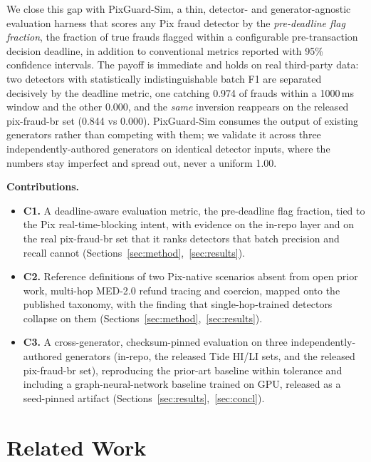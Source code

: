 \documentclass[12pt]{article}
\newcommand{\sysname}{PixGuard-Sim\xspace}
\newcommand{\rfPre}{0.974}        %
\newcommand{\gbPreThousand}{0.000} %
\newcommand{\PfbXgbPre}{0.844}
\newcommand{\PfbGbPre}{0.000}
\begin{document}
We close this gap with \sysname, a thin, detector- and generator-agnostic
evaluation harness that scores any Pix fraud detector by the
\emph{pre-deadline flag fraction}, the fraction of true frauds flagged within a
configurable pre-transaction decision deadline, in addition to conventional
metrics reported with 95\% confidence intervals. The payoff is immediate and
holds on real third-party data: two detectors with statistically
indistinguishable batch F1 are separated decisively by the deadline metric,
one catching \rfPre{} of frauds within a 1000\,ms window and the other
\gbPreThousand{}, and the \emph{same} inversion reappears on the released
pix-fraud-br set (\PfbXgbPre{} vs \PfbGbPre{}). \sysname{} consumes the output of
existing generators rather than competing with them; we validate it across
three independently-authored generators on identical detector inputs, where the
numbers stay imperfect and spread out, never a uniform 1.00.

\noindent\textbf{Contributions.}
\begin{itemize}[itemsep=1pt,topsep=2pt,leftmargin=*]
\item \textbf{C1.} A deadline-aware evaluation metric, the pre-deadline flag
fraction, tied to the Pix real-time-blocking intent, with evidence on the
in-repo layer and on the real pix-fraud-br set that it ranks detectors that
batch precision and recall cannot (Sections~\ref{sec:method},~\ref{sec:results}).
\item \textbf{C2.} Reference definitions of two Pix-native scenarios absent
from open prior work, multi-hop MED-2.0 refund tracing and coercion, mapped onto
the published taxonomy, with the finding that single-hop-trained
detectors collapse on them (Sections~\ref{sec:method},~\ref{sec:results}).
\item \textbf{C3.} A cross-generator, checksum-pinned evaluation on three
independently-authored generators (in-repo, the released Tide HI/LI sets, and
the released pix-fraud-br set), reproducing the prior-art baseline within
tolerance and including a graph-neural-network baseline trained on GPU, released
as a seed-pinned artifact (Sections~\ref{sec:results},~\ref{sec:concl}).
\end{itemize}

\section{Related Work}\label{sec:related}
\end{document}
